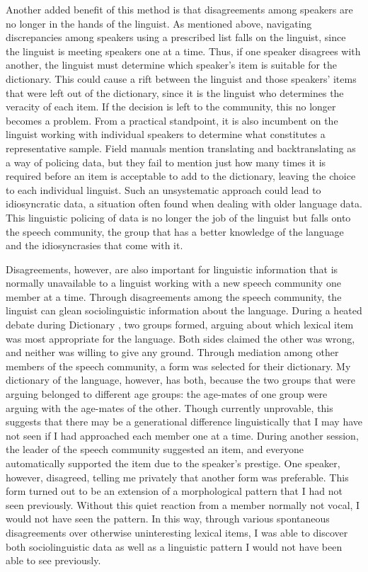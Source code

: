 \documentclass[output=paper,
modfonts
]{langscibook}
\begin{document}
Another added benefit of this method is that disagreements among speakers are no longer in the hands of the linguist. As mentioned above, navigating discrepancies among speakers using a prescribed list falls on the linguist, since the linguist is meeting speakers one at a time. Thus, if one speaker disagrees with another, the linguist must determine which speaker’s item is suitable for the dictionary. This could cause a rift between the linguist and those speakers’ items that were left out of the dictionary, since it is the linguist who determines the veracity of each item. If the decision is left to the community, this no longer becomes a problem. From a practical standpoint, it is also incumbent on the linguist working with individual speakers to determine what constitutes a representative sample. Field manuals mention translating and backtranslating as a way of policing data, but they fail to mention just how many times it is required before an item is acceptable to add to the dictionary, leaving the choice to each individual linguist. Such an unsystematic approach could lead to idiosyncratic data, a situation often found when dealing with older language data. This linguistic policing of data is no longer the job of the linguist but falls onto the speech community, the group that has a better knowledge of the language and the idiosyncrasies that come with it. 

Disagreements, however, are also important for linguistic information that is normally unavailable to a linguist working with a new speech community one member at a time. Through disagreements among the speech community, the linguist can glean sociolinguistic information about the language. During a heated debate during Dictionary , two groups formed, arguing about which lexical item was most appropriate for the language. Both sides claimed the other was wrong, and neither was willing to give any ground. Through mediation among other members of the speech community, a form was selected for their dictionary. My dictionary of the language, however, has both, because the two groups that were arguing belonged to different age groups:  the age-mates of one group were arguing with the age-mates of the other. Though currently unprovable, this suggests that there may be a generational difference linguistically that I may have not seen if I had approached each member one at a time. During another session, the leader of the speech community suggested an item, and everyone automatically supported the item due to the speaker’s prestige. One speaker, however, disagreed, telling me privately that another form was preferable. This form turned out to be an extension of a morphological pattern that I had not seen previously. Without this quiet reaction from a member normally not vocal, I would not have seen the pattern. In this way, through various spontaneous disagreements over otherwise uninteresting lexical items, I was able to discover both sociolinguistic data as well as a linguistic pattern I would not have been able to see previously. 
\end{document}
